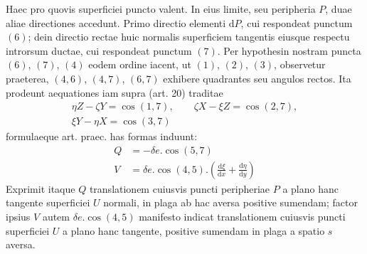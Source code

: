 Haec pro quovis superficiei puncto valent. In eius limite, seu peripheria $P$, duae aliae directiones accedunt. Primo directio elementi $\mathrm{d}P$, cui respondeat
punctum $(6)$; dein directio rectae huic normalis superficiem tangentis eiusque respectu introrsum ductae, cui respondeat punctum $(7)$. Per hypothesin nostram puncta $(6)$, $(7)$, $(4)$ eodem ordine iacent, ut $(1)$, $(2)$, $(3)$, observetur praeterea, $(4,6)$, $(4,7)$, $(6,7)$ exhibere quadrantes seu angulos rectos. Ita prodeunt aequationes iam supra (art. 20) traditae
\[
\begin{gathered}
\eta Z-\zeta Y=\cos(1,7),\qquad \zeta X-\xi Z=\cos(2,7),\\
\xi Y-\eta X=\cos(3,7)
\end{gathered}
\]
formulaeque art. praec. has formas induunt:
\[
\begin{aligned}
Q&=-\delta e.\cos(5,7)\\
V&=\delta e.\cos(4,5).(\frac{\mathrm{d}\xi}{\mathrm{d}x}+\frac{\mathrm{d}\eta}{\mathrm{d}y})
\end{aligned}
\]
Exprimit itaque $Q$ translationem cuiusvis puncti peripheriae $P$ a plano hanc tangente superficiei $U$ normali, in plaga ab hac aversa positive sumendam; factor ipsius $V$ autem $\delta e.\cos(4,5)$ manifesto indicat translationem cuiusvis puncti superficiei $U$ a plano hanc tangente, positive sumendam in plaga a spatio $s$ aversa.

